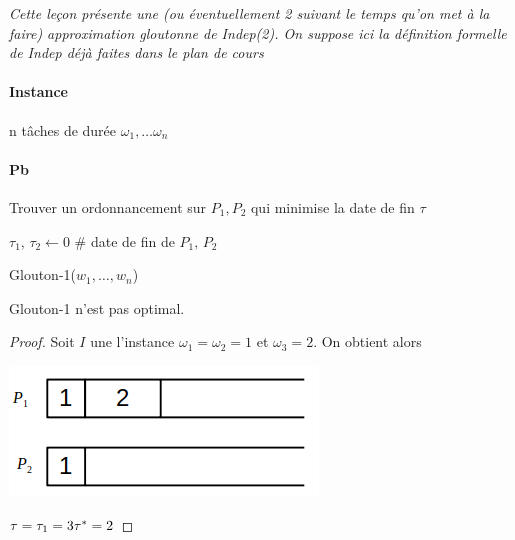 
\textit{Cette leçon présente une (ou éventuellement 2 suivant le temps qu'on met à la faire) approximation gloutonne de Indep(2). On suppose ici la définition formelle de Indep déjà faites dans le plan de cours}

\paragraph{Instance} n tâches de durée $\omega_1, \dots \omega_n$
\paragraph{Pb} Trouver un ordonnancement sur $P_1, P_2$ qui minimise la date de fin $\tau$

\begin{algorithm}[H]
$\tau_1, \,\tau_2 \leftarrow 0$ \quad\# date de fin de $P_1,\,P_2$ \\
{
}
\caption{Glouton-1($w_1, \dots, w_n$)}
\end{algorithm}

\begin{proposition}
	Glouton-1 n'est pas optimal.
\end{proposition}

\begin{proof}
	Soit $I$ une l'instance $\omega_1 = \omega_2 = 1$ et $\omega_3 = 2$. On obtient alors\\
	\begin{minipage}{0.4\linewidth}
		\includegraphics[scale = 0.5]{Developpements/Glouton indep 2/instance1.png} 
	\end{minipage}
	\begin{minipage}{0.4\linewidth}
		$\tau = \tau_1 = 3 \newline \tau^* = 2$
	\end{minipage}
\end{proof}

